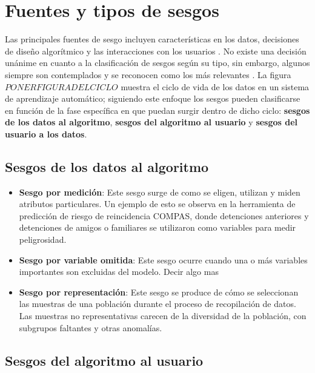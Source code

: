 \section{Fuentes y tipos de sesgos}

    Las principales fuentes de sesgo incluyen caracter\'isticas en los datos, decisiones de dise\~no algor\'itmico y las interacciones 
    con los usuarios \parencite{resp_data}.
    No existe una decisi\'on un\'anime en cuanto a la clasificaci\'on de sesgos seg\'un su tipo, sin embargo, 
    algunos siempre son contemplados y se reconocen como los m\'as relevantes \parencite{survey}. La figura $PONER FIGURA DEL CICLO$ muestra 
    el ciclo de vida de los datos en un sistema de aprendizaje autom\'atico; siguiendo este enfoque los sesgos pueden clasificarse 
    en funci\'on de la fase espec\'ifica en que puedan surgir dentro de dicho ciclo: \textbf{sesgos de los datos al algoritmo}, 
    \textbf{sesgos del algoritmo al usuario} y \textbf{sesgos del usuario a los datos}.
    
    \subsection{Sesgos de los datos al algoritmo}
    
    \begin{itemize}
        \item \textbf{Sesgo por medici\'on}: Este sesgo surge de como se eligen, utilizan y miden atributos particulares. Un ejemplo de esto se observa 
        en la herramienta de predicci\'on de riesgo de reincidencia COMPAS, donde detenciones anteriores y detenciones de amigos o familiares se utilizaron 
        como variables para medir peligrosidad.
        
        \item \textbf{Sesgo por variable omitida}: Este sesgo ocurre cuando una o m\'as variables importantes son excluidas del modelo. Decir algo mas
        
        \item \textbf{Sesgo por representaci\'on}: Este sesgo se produce de c\'omo se seleccionan las muestras de una poblaci\'on durante el proceso de
        recopilaci\'on de datos. Las muestras no representativas carecen de la diversidad de la poblaci\'on, con subgrupos faltantes y otras anomal\'ias.
    \end{itemize}
    
    \subsection{Sesgos del algoritmo al usuario}

